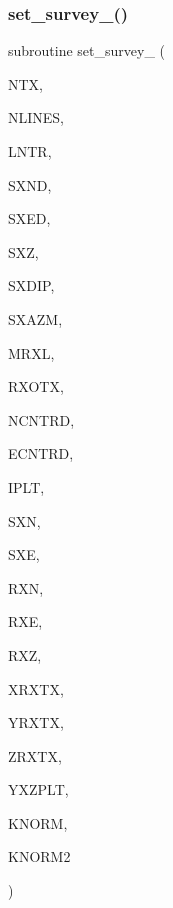 \subsubsection{\texorpdfstring{set\+\_\+survey\+\_()}{set\_survey\_5()}}
{\footnotesize\ttfamily subroutine set\+\_\+survey\+\_ (\begin{DoxyParamCaption}\item[{integer}]{N\+TX,  }\item[{integer}]{N\+L\+I\+N\+ES,  }\item[{integer, dimension(4,nlines)}]{L\+N\+TR,  }\item[{real(kind=ql), dimension(1,ntx)}]{S\+X\+ND,  }\item[{real(kind=ql), dimension(1,ntx)}]{S\+X\+ED,  }\item[{real, dimension(ntx)}]{S\+XZ,  }\item[{real, dimension(ntx)}]{S\+X\+D\+IP,  }\item[{real, dimension(ntx)}]{S\+X\+A\+ZM,  }\item[{integer}]{M\+R\+XL,  }\item[{real, dimension(ntx)}]{R\+X\+O\+TX,  }\item[{real(kind=ql)}]{N\+C\+N\+T\+RD,  }\item[{real(kind=ql)}]{E\+C\+N\+T\+RD,  }\item[{integer, dimension(nlines)}]{I\+P\+LT,  }\item[{real, dimension(1,ntx)}]{S\+XN,  }\item[{real, dimension(1,ntx)}]{S\+XE,  }\item[{real, dimension (mrxl,nlines,1)}]{R\+XN,  }\item[{real, dimension (mrxl,nlines,1)}]{R\+XE,  }\item[{real, dimension (mrxl,nlines)}]{R\+XZ,  }\item[{real, dimension(1,ntx,1)}]{X\+R\+X\+TX,  }\item[{real, dimension(1,ntx,1)}]{Y\+R\+X\+TX,  }\item[{real, dimension(1,ntx)}]{Z\+R\+X\+TX,  }\item[{real(kind=ql), dimension(3,mrxl,nlines)}]{Y\+X\+Z\+P\+LT,  }\item[{integer, dimension(nlines)}]{K\+N\+O\+RM,  }\item[{integer, dimension(1,ntx)}]{K\+N\+O\+R\+M2 }\end{DoxyParamCaption})}

\mbox{\label{Leroi__c_8f90_a070fa81fa07083804479fa6b78707607}} 
